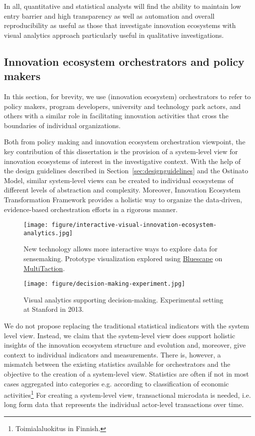 In all, quantitative and statistical analysts will find the ability to maintain low entry barrier and high transparency as well as automation and overall reproducibility as useful as those that investigate innovation ecosystems with visual analytics approach particularly useful in qualitative investigations.

\subsection{Innovation ecosystem orchestrators and policy makers}

In this section, for brevity, we use (innovation ecosystem) orchestrators to refer to policy makers, program developers, university and technology park actors, and others with a similar role in facilitating innovation activities that cross the boundaries of individual organizations.

Both from policy making and innovation ecosystem orchestration viewpoint, the key contribution of this dissertation is the provision of a system-level view for innovation ecosystems of interest in the investigative context. With the help of the design guidelines described in Section~\ref{sec:designguidelines} and the Ostinato Model, similar system-level views can be created to individual ecosystems of different levels of abstraction and complexity. Moreover, Innovation Ecosystem Transformation Framework \citep{Russell2011TransformingOrchestration, Russell2015RelationalEcosystems} provides a holistic way to organize the data-driven, evidence-based orchestration efforts in a rigorous manner.

\begin{figure}[htb]
\centering
\texttt{[image: figure/interactive-visual-innovation-ecosystem-analytics.jpg]}
\caption{New technology allows more interactive ways to explore data for sensemaking. Prototype visualization explored using \href{https://www.bluescape.com/}{Bluescape} on \href{http://www.multitaction.com/}{MultiTaction}.}
\label{fig:interactiveanalytics}
\end{figure}

\begin{figure}[htb]
\centering
\texttt{[image: figure/decision-making-experiment.jpg]}
\caption{Visual analytics supporting decision-making. Experimental setting at Stanford in 2013.}
\label{fig:experiment}
\end{figure}

We do not propose replacing the traditional statistical indicators with the system level view. Instead, we claim that the system-level view does support holistic insights of the innovation ecosystem structure and evolution and, moreover, give context to individual indicators and measurements. There is, however, a mismatch between the existing statistics available for orchestrators and the objective to the creation of a system-level view. Statistics are often if not in most cases aggregated into categories e.g. according to classification of economic activities\footnote{Toimialaluokitus in Finnish.} For creating a system-level view, transactional microdata is needed, i.e. long form data that represents the individual actor-level transactions over time.

